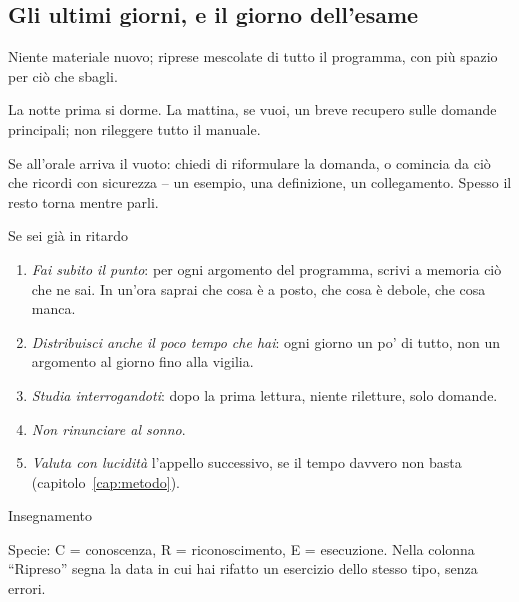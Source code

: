 \subsection*{Gli ultimi giorni, e il giorno dell'esame}

\begin{controlli}
  \item Niente materiale nuovo; riprese mescolate di tutto il programma,
        con più spazio per ciò che sbagli.
  \item La notte prima si dorme. La mattina, se vuoi, un breve recupero
        sulle domande principali; non rileggere tutto il manuale.
  \item Se all'orale arriva il vuoto: chiedi di riformulare la domanda,
        o comincia da ciò che ricordi con sicurezza -- un esempio, una
        definizione, un collegamento. Spesso il resto torna mentre
        parli.
\end{controlli}

\begin{riquadro}{Se sei già in ritardo}
\begin{enumerate}[leftmargin=1.4em]
  \item \emph{Fai subito il punto}: per ogni argomento del programma,
        scrivi a memoria ciò che ne sai. In un'ora saprai che cosa è a
        posto, che cosa è debole, che cosa manca.
  \item \emph{Distribuisci anche il poco tempo che hai}: ogni giorno un
        po' di tutto, non un argomento al giorno fino alla vigilia.
  \item \emph{Studia interrogandoti}: dopo la prima lettura, niente
        riletture, solo domande.
  \item \emph{Non rinunciare al sonno}.
  \item \emph{Valuta con lucidità} l'appello successivo, se il tempo
        davvero non basta (capitolo~\ref{cap:metodo}).
\end{enumerate}
\end{riquadro}


{\small\noindent Insegnamento \hrulefill\par}
\vspace{0.6\baselineskip}

{\footnotesize\noindent Specie: C = conoscenza, R = riconoscimento,
E = esecuzione. Nella colonna \enquote{Ripreso} segna la data in cui hai
rifatto un esercizio dello stesso tipo, senza errori.\par}
\vspace{0.6\baselineskip}


